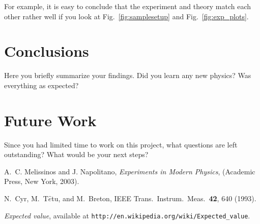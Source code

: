 \documentclass[12pt]{article}
\begin{document}
For example, it is easy to conclude that the
experiment and theory match each other rather well if you look at
Fig.~\ref{fig:samplesetup} and Fig.~\ref{fig:exp_plots}.


\section{Conclusions}
Here you briefly summarize your findings. Did you learn any new physics? Was everything as expected?

\blindtext

\section{Future Work}
Since you had limited time to work on this project, what questions are left outstanding? What would be your next steps?

\blindtext


\begin{thebibliography}{99}

	A.~C. Melissinos and J. Napolitano, \textit{Experiments in Modern Physics},
	(Academic Press, New York, 2003).

	N.\ Cyr, M.\ T$\hat{e}$tu, and M.\ Breton,
	IEEE Trans.\ Instrum.\ Meas.\ \textbf{42}, 640 (1993).

	 \emph{Expected value},  available at
	\texttt{http://en.wikipedia.org/wiki/Expected\_value}.

\end{thebibliography}
\end{document}
